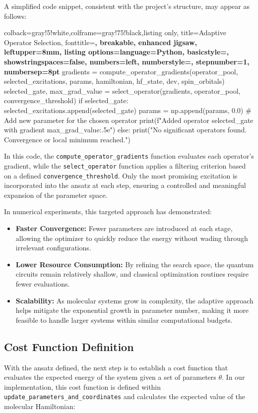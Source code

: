 A simplified code snippet, consistent with the project’s structure, may appear as follows:

\begin{tcblisting}{colback=gray!5!white,colframe=gray!75!black,listing only,
  title=Adaptive Operator Selection, fonttitle=\bfseries, breakable, enhanced jigsaw, leftupper=8mm,
  listing options={language=Python, basicstyle=\ttfamily\small,
  showstringspaces=false, numbers=left, numberstyle=\footnotesize, stepnumber=1, numbersep=8pt}}
gradients = compute_operator_gradients(operator_pool, selected_excitations, params, hamiltonian, hf_state, dev, spin_orbitals)
selected_gate, max_grad_value = select_operator(gradients, operator_pool, convergence_threshold)
if selected_gate:
    selected_excitations.append(selected_gate)
    params = np.append(params, 0.0)  # Add new parameter for the chosen operator
    print(f"Added operator {selected_gate} with gradient {max_grad_value:.5e}")
else:
    print("No significant operators found. Convergence or local minimum reached.")
\end{tcblisting}

In this code, the \texttt{compute\_operator\_gradients} function evaluates each operator’s gradient, while the \texttt{select\_operator} function applies a filtering criterion based on a defined \texttt{convergence\_threshold}. Only the most promising excitation is incorporated into the ansatz at each step, ensuring a controlled and meaningful expansion of the parameter space.

In numerical experiments, this targeted approach has demonstrated:
\begin{itemize}
    \item \textbf{Faster Convergence:} Fewer parameters are introduced at each stage, allowing the optimizer to quickly reduce the energy without wading through irrelevant configurations.
    \item \textbf{Lower Resource Consumption:} By refining the search space, the quantum circuits remain relatively shallow, and classical optimization routines require fewer evaluations.
    \item \textbf{Scalability:} As molecular systems grow in complexity, the adaptive approach helps mitigate the exponential growth in parameter number, making it more feasible to handle larger systems within similar computational budgets.
\end{itemize}


\subsection{Cost Function Definition}
With the ansatz defined, the next step is to establish a cost function that evaluates the expected energy of the system given a set of parameters \(\theta\). In our implementation, this cost function is defined within \texttt{update\_parameters\_and\_coordinates} and calculates the expected value of the molecular Hamiltonian:
  
